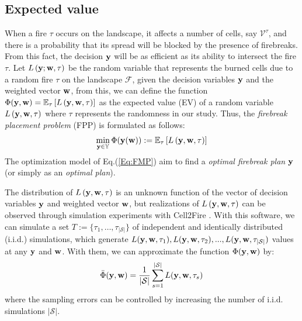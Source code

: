 \documentclass[a4paper,fleqn]{cas-sc}
\begin{document}
\subsection{Expected value}
When a fire $\tau$ occurs on the landscape, it affects a number of cells, say $\mathcal{V}^\tau$, and there is a probability that its spread will be blocked by the presence of firebreaks. From this fact, the decision $\vb{y}$ will be as efficient as its ability to intersect the fire $\tau$. Let $ L\left(\vb{y}; \vb{w}, \tau \right) $ be the random variable that represents the burned cells due to a random fire $\tau$ on the landscape $\mathcal{F}$, given the decision variables $\vb{y}$ and the weighted vector $\vb{w}$, from this, we can define the function $\Phi(\vb{y},\vb{w})=\mathbb{E}_\mathcal{\tau} \left[ L \left(\vb{y}, \vb{w}, \tau \right) \right]$ as the expected value (EV) of a random variable $ L\left(\vb{y}, \vb{w}, \tau \right) $ where $\tau$  represents the randomness in our study. Thus, the \textit{firebreak placement problem} (FPP) is formulated as follows:   
\begin{equation} \label{Eq:FMP}
    \min_{\vb{y} \in \mathbb{Y}} \Phi(\vb{y(\vb{w})}):=\mathbb{E}_\mathcal{\tau} \left[ L \left(\vb{y}, \vb{w}, \tau \right) \right]
\end{equation}
The optimization model of Eq.\:(\ref{Eq:FMP}) aim to find a \textit{optimal firebreak plan} $\vb{
y}$ (or simply as an \textit{optimal plan}).



The distribution of $ L\left(\vb{y}, \vb{w},\tau \right) $ is an unknown function of the vector of decision variables $\vb{y}$ and weighted vector $\vb{w}$, but realizations of $ L\left(\vb{y}, \vb{w}, \tau \right) $ can be observed through simulation experiments with Cell2Fire \citep{pais2021cell2fire}. With this software, we can simulate a set $T := \{\tau_1, \dots, \tau_{\lvert \mathcal{S}\vert}\}$  of independent and identically distributed (i.i.d.) simulations, which generate $L(\vb{y}, \vb{w}, \tau_1),L(\vb{y}, \vb{w}, \tau_2),...,L(\vb{y}, \vb{w}, \tau_{\lvert \mathcal{S}\vert})$ values at any $\vb{y}$ and $\vb{w}$. With them, we can approximate the function $\Phi(\vb{y}, \vb{w})$ by:
\begin{equation} \label{Eq:EVAL}
    \Bar{\Phi}(\vb{y}, \vb{w}) = \dfrac{1}{\lvert \mathcal{S}\vert} \sum_{s=1}^{\lvert \mathcal{S}\vert}L(\vb{y}, \vb{w},\tau_s)
\end{equation}
where the sampling errors can be controlled by increasing the number of i.i.d. simulations $\lvert \mathcal{S}\vert$.
\end{document}
